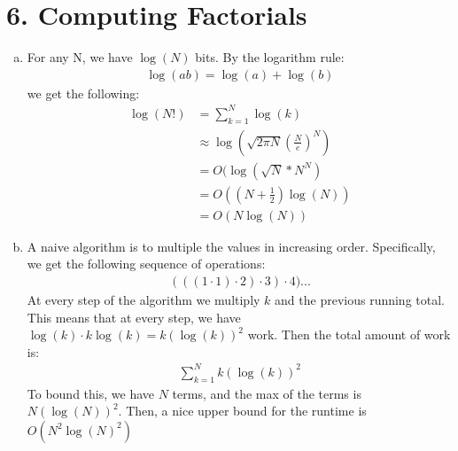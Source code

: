 \documentclass[a4paper]{article}
\newcommand{\<}{\langle}
\renewcommand{\>}{\rangle}
\renewcommand{\^}{\wedge}
\begin{document}
\section{6. Computing Factorials}
\begin{enumerate}[a)]
    \item For any N, we have $\log(N)$ bits. By the logarithm rule:
    \begin{align*}
        \log(ab) = \log(a) + \log(b)
    \end{align*}
    we get the following:
    \begin{align*}
        \log(N!) &= \sum_{k=1}^{N}\log(k)\\
        &\approx \log(\sqrt{2 \pi N}(\frac{N}{e})^N)\\
        &= O(\log(\sqrt{N} * N^N)\\
        &= O((N+\frac{1}{2})\log(N))\\
        &= O(N\log(N))
    \end{align*}
    \item A naive algorithm is to multiple the values in increasing order. Specifically, we get the following sequence of operations:
    \begin{align*}
        (((1\cdot1)\cdot2)\cdot3)\cdot4)...
    \end{align*}
    At every step of the algorithm we multiply $k$ and the previous running total. This means that at every step, we have $\log(k) \cdot k\log(k) = k(\log(k))^2$ work. Then the total amount of work is:
    \begin{align*}
        \sum_{k=1}^{N} k(\log(k))^2
    \end{align*}
    To bound this, we have $N$ terms, and the max of the terms is $N(\log(N))^2$. Then, a nice upper bound for the runtime is $O(N^2\log(N)^2)$
\end{enumerate}
\newpage
\end{document}
